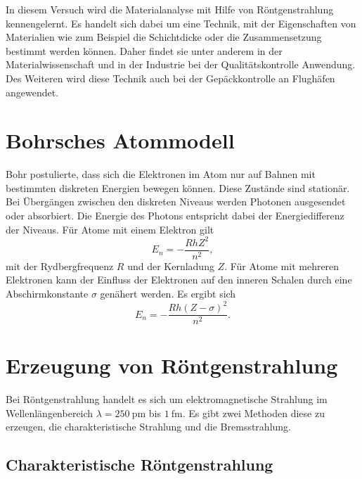 In diesem Versuch wird die Materialanalyse mit Hilfe von Röntgenstrahlung kennengelernt. Es handelt sich dabei um eine Technik, mit der Eigenschaften von Materialien wie zum Beispiel die Schichtdicke oder die Zusammensetzung bestimmt werden können. Daher findet sie unter anderem in der Materialwissenschaft und in der Industrie bei der Qualitätskontrolle Anwendung.
Des Weiteren wird diese Technik auch bei der Gepäckkontrolle an Flughäfen angewendet.

\section{Bohrsches Atommodell}

Bohr postulierte, dass sich die Elektronen im Atom nur auf Bahnen mit bestimmten diskreten Energien bewegen können. Diese Zustände sind stationär. Bei Übergängen zwischen den diskreten Niveaus werden Photonen ausgesendet oder absorbiert. 
Die Energie des Photons entspricht dabei der Energiedifferenz der Niveaus. Für Atome mit einem Elektron gilt
\begin{equation}
 E_{n} = -\frac{RhZ^{2}}{n^{2}},
\end{equation}
mit der Rydbergfrequenz $R$ und der Kernladung $Z$. Für Atome mit mehreren Elektronen kann der Einfluss der Elektronen auf den inneren Schalen durch eine Abschirmkonstante $\sigma$ genähert werden. Es ergibt sich
\begin{equation}
 E_{n} = -\frac{Rh(Z-\sigma)^{2}}{n^{2}}.
\end{equation}

\section{Erzeugung von Röntgenstrahlung}

Bei Röntgenstrahlung handelt es sich um elektromagnetische Strahlung im Wellenlängenbereich $\lambda=\SI{250}{\pico\metre}$ bis $\SI{1}{\femto\metre}$. Es gibt zwei Methoden diese zu erzeugen, die charakteristische Strahlung und die Bremsstrahlung.

\subsection{Charakteristische Röntgenstrahlung}

